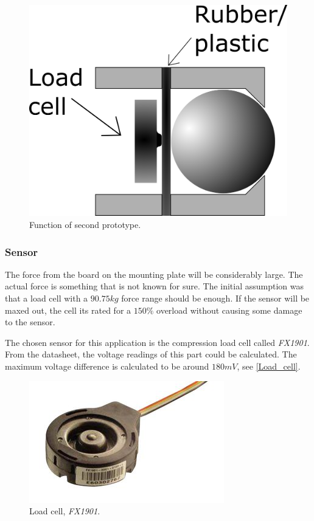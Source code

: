 \begin{figure}[H]
\begin{center}
	\includegraphics[width = .45\textwidth]{Figures/Press_sens_func_2.png}
	\caption{Function of second prototype.}
	\label{Press_sens_prot_2}
\end{center}
\end{figure}



\subsubsection{Sensor}
The force from the board on the mounting plate will be considerably large. The actual force is something that is not known for sure. The initial assumption was that a load cell with a $90.75kg$ force range should be enough. If the sensor will be maxed out, the cell its rated for a $150\%$ overload without causing some damage to the sensor. 

The chosen sensor for this application is the compression load cell called \emph{FX1901}. 
From the datasheet\cite{load_cell}, the voltage readings of this part could be calculated. The maximum voltage difference is calculated to be around $180mV$, see \autoref{Load_cell}.
\begin{figure}[H]
\begin{center}
	\includegraphics[width = .45\textwidth]{Figures/Load_cell.png}
	\caption{Load cell, \emph{FX1901}.}
	\label{Load_cell}
\end{center}
\end{figure}


